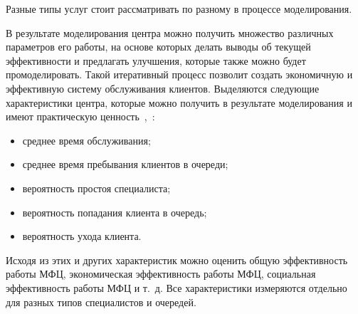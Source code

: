 Разные типы услуг стоит рассматривать по разному в процессе моделирования.

В результате моделирования центра можно получить множество различных параметров его работы, на основе которых делать выводы об текущей эффективности и предлагать улучшения, которые также можно будет промоделировать. Такой итеративный процесс позволит создать экономичную и эффективную систему обслуживания клиентов. Выделяются следующие характеристики центра, которые можно получить в результате моделирования и имеют практическую ценность~\cite{har1},~\cite{har2}:
\begin{itemize}[label=---]
	\item среднее время обслуживания;
	\item среднее время пребывания клиентов в очереди;
	\item вероятность простоя специалиста;
	\item вероятность попадания клиента в очередь;
	\item вероятность ухода клиента.
\end{itemize}

Исходя из этих и других характеристик можно оценить общую эффективность работы МФЦ, экономическая эффективность работы МФЦ, социальная эффективность работы МФЦ и т.~д. Все характеристики измеряются отдельно для разных типов специалистов и очередей. 